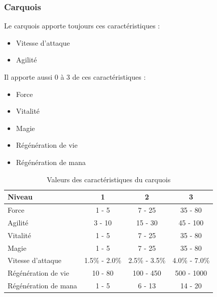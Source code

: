 \documentclass[11pt, a4paper, oneside]{report}
\begin{document}
\subsubsection{Carquois}
Le carquois apporte toujours ces caractéristiques :
\begin{multicols}{2}
\begin{itemize}
	\item Vitesse d'attaque
	\item Agilité
\end{itemize}
\end{multicols}
Il apporte aussi 0 à 3 de ces caractéristiques :
\begin{multicols}{2}
\begin{itemize}
    \item Force
    \item Vitalité
    \item Magie
    \item Régénération de vie
    \item Régénération de mana
\end{itemize}
\end{multicols}
\begin{table}[H]
\begin{center}
\begin{tabular}{| l | c | c | c |}
  \hline      
  Niveau 				& 1 & 2 & 3\\ \hline \hline                 
  Force 				& 1 - 5 & 7 - 25 & 35 - 80\\ \hline
  Agilité 				& 3 - 10 & 15 - 30 & 45 - 100\\ \hline
  Vitalité 				& 1 - 5 & 7 - 25 & 35 - 80\\ \hline
  Magie 				& 1 - 5 & 7 - 25 & 35 - 80\\ \hline
  Vitesse d'attaque 	& 1.5\% - 2.0\% & 2.5\% - 3.5\% & 4.0\% - 7.0\%\\ \hline
  Régénération de vie 	& 10 - 80  & 100 - 450 & 500 - 1000\\ \hline
  Régénération de mana 	& 1 - 5  & 6 - 13 & 14 - 20\\ \hline
\end{tabular}
\caption{Valeurs des caractéristiques du carquois}
\end{center}
\end{table}
\end{document}
